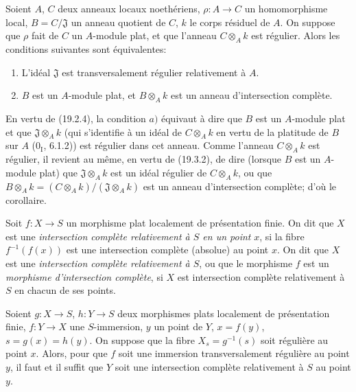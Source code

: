 \begin{corollary}[19.3.5]
\label{IV.19.3.5}
Soient $A$, $C$ deux anneaux locaux noethériens, $\rho:A\to C$ un homomorphisme local, $B=C/\mathfrak J$ un anneau quotient de $C$, $k$ le corps résiduel de $A$. On suppose que $\rho$ fait de $C$ un $A$-module plat, et que l'anneau $C\otimes_A k$ est régulier. Alors les conditions suivantes sont équivalentes:
\begin{enumerate}
  \item[a)] L'idéal $\mathfrak J$ est transversalement régulier relativement à $A$.
  \item[b)] $B$ est un $A$-module plat, et $B\otimes_A k$ est un anneau d'intersection complète.
\end{enumerate}
\end{corollary}


En vertu de (19.2.4), la condition $a)$ équivaut à dire que $B$ est un $A$-module plat et que $\mathfrak J\otimes_A k$ (qui s'identifie à un idéal de $C\otimes_A k$ en vertu de la platitude de $B$ sur $A$ ($0_{\mathrm I}$, 6.1.2)) est régulier dans cet anneau. Comme l'anneau $C\otimes_A k$ est régulier, il revient au même, en vertu de (19.3.2), de dire (lorsque $B$ est un $A$-module plat) que $\mathfrak J\otimes_A k$ est un idéal régulier de $C\otimes_A k$, ou que $B\otimes_A k=(C\otimes_A k)/(\mathfrak J\otimes_A k)$ est un anneau d'intersection complète; d'où le corollaire.

\begin{definition}[19.3.6]
\label{IV.19.3.6}
Soit $f:X\to S$ un morphisme plat localement de présentation finie. On dit que $X$ est une \emph{intersection complète relativement à $S$ en un point} $x$, si la fibre $f^{-1}(f(x))$ est une intersection complète (absolue) au point $x$. On dit que $X$ est une \emph{intersection complète relativement à $S$}, ou que le morphisme $f$ est un \emph{morphisme d'intersection complète}, si $X$ est intersection complète relativement à $S$ en chacun de ses points.
\end{definition}

\begin{proposition}[19.3.7]
\label{IV.19.3.7}
Soient $g:X\to S$, $h:Y\to S$ deux morphismes plats localement de présentation finie, $f:Y\to X$ une $S$-immersion, $y$ un point de $Y$, $x=f(y)$, $s=g(x)=h(y)$. On suppose que la fibre $X_s=g^{-1}(s)$ soit régulière au point $x$. Alors, pour que $f$ soit une immersion transversalement régulière au point $y$, il faut et il suffit que $Y$ soit une intersection complète relativement à $S$ au point $y$.
\end{proposition}

